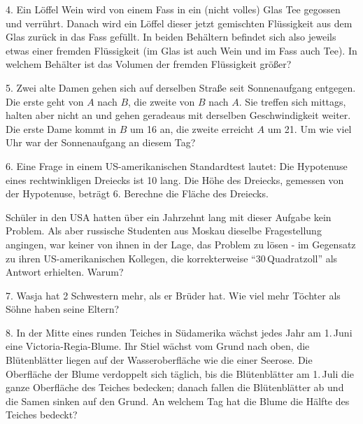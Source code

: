 \begin{problem}{4.}
	Ein Löffel Wein wird von einem Fass in ein (nicht volles) Glas Tee gegossen und verrührt. Danach wird ein Löffel dieser jetzt gemischten Flüssigkeit aus dem Glas zurück in das Fass gefüllt. In beiden Behältern befindet sich also jeweils etwas einer fremden Flüssigkeit (im Glas ist auch Wein und im Fass auch Tee). In welchem Behälter ist das Volumen der fremden Flüssigkeit größer?
\end{problem}

\begin{problem}{5.}
	Zwei alte Damen gehen sich auf derselben Straße seit Sonnenaufgang entgegen. Die erste geht von $A$ nach $B$, die zweite von $B$ nach $A$. Sie treffen sich mittags, halten aber nicht an und gehen geradeaus mit derselben Geschwindigkeit weiter. Die erste Dame kommt in $B$ um \SI{16}{\uhr} an, die zweite erreicht $A$ um \SI{21}{\uhr}. Um wie viel Uhr war der Sonnenaufgang an diesem Tag?
\end{problem}

\begin{problem}{6.}
	Eine Frage in einem US-amerikanischen Standardtest lautet: Die Hypotenuse eines rechtwinkligen Dreiecks ist \SI{10}{\zoll} lang. Die Höhe des Dreiecks, gemessen von der Hypotenuse, beträgt \SI{6}{\zoll}. Berechne die Fläche des Dreiecks.

	Schüler in den USA hatten über ein Jahrzehnt lang mit dieser Aufgabe kein Problem. Als aber russische Studenten aus Moskau dieselbe Fragestellung angingen, war keiner von ihnen in der Lage, das Problem zu lösen - im Gegensatz zu ihren US-amerikanischen Kollegen, die korrekterweise \enquote{30\,Quadratzoll} als Antwort erhielten. Warum?
\end{problem}

\begin{problem}{7.}
	Wasja hat 2 Schwestern mehr, als er Brüder hat. Wie viel mehr Töchter als Söhne haben seine Eltern?
\end{problem}

\begin{problem}{8.}
	In der Mitte eines runden Teiches in Südamerika wächst jedes Jahr am 1.\,Juni eine Victoria-Regia-Blume. Ihr Stiel wächst vom Grund nach oben, die Blütenblätter liegen auf der Wasseroberfläche wie die einer Seerose. Die Oberfläche der Blume verdoppelt sich täglich, bis die Blütenblätter am 1.\,Juli die ganze Oberfläche des Teiches bedecken; danach fallen die Blütenblätter ab und die Samen sinken auf den Grund. An welchem Tag hat die Blume die Hälfte des Teiches bedeckt?
\end{problem}

